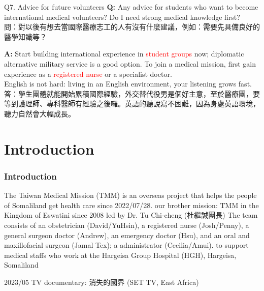 \documentclass[aspectratio=169]{beamer}
\begin{document}
\begin{frame}{Q7. Advice for future volunteers}
\textbf{Q:} Any advice for students who want to become international medical volunteers? Do I need strong medical knowledge first? \\
{\footnotesize\color{gray}問：對以後有想去當國際醫療志工的人有沒有什麼建議，例如：需要先具備良好的醫學知識等？}

\vspace{0.8em}
\textbf{A:} Start building international experience in \textcolor{red}{student groups} now; diplomatic alternative military service is a good option. To join a medical mission, first gain experience as a \textcolor{red}{registered nurse} or a specialist doctor. \\ English is not hard: living in an English environment, your listening grows fast. \\
{\footnotesize\color{gray}答：學生團體就能開始累積國際經驗，外交替代役男是個好主意，至於醫療團，要等到護理師、專科醫師有經驗之後囉。英語的聽說寫不困難，因為身處英語環境，聽力自然會大幅成長。}
\end{frame}




\section{Introduction}
\begin{frame}
\frametitle{Introduction}
\begin{outline}
    

\1 The Taiwan Medical Mission (TMM) is an overseas project that helps the people of Somaliland get health care since 2022/07/28.
    \2 our brother mission: TMM in the Kingdom of Eswatini since 2008 led by Dr. Tu Chi-cheng (杜繼誠團長)
\1 The team consists of %
    \2 an obstetrician (David/YuHsin), a registered nurse (Josh/Penny), a general surgeon doctor (Andrew), an emergency doctor (Hsu), and an oral and maxillofacial surgeon (Jamal Tex); a administrator (Cecilia/Amui). 
    \2 to support medical staffs who work at the Hargeisa Group Hospital (HGH), Hargeisa, Somaliland



\end{outline}

2023/05 TV documentary: 消失的國界 (SET TV, East Africa)

\end{frame}
\end{document}
